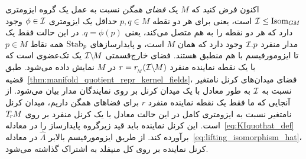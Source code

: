 اکنون فرض کنید که $M$ یک \emph{فضای همگن} نسبت به عمل یک گروه ایزومتری $\mathcal{I} \leq \operatorname{Isom}_{G\mkern-1.4muM}$ است، یعنی برای هر دو نقطه $p,q\in M$ حداقل یک ایزومتری $\phi \in \mathcal{I}$ وجود دارد که هر دو نقطه را به هم متصل می‌کند، یعنی $q = \phi(p)$.
در این حالت فقط یک مدار منفرد $\mathcal{I}.p$ وجود دارد که همان $M$ است، و پایدارسازهای $\operatorname{Stab}_{p}$ همه نقاط $p\in M$ تا ایزومورفیسم با هم منطبق هستند.
فضای خارج‌قسمتی $\mathcal{I}\backslash\mkern-1.5mu M$ یک تک‌عضوی است که با یک نقطه نماینده منفرد $r = \rM(\IM)$ در $M$ نمایش داده می‌شود.
طبق قضیه~\ref{thm:manifold_quotient_repr_kernel_fields}، فضای میدان‌های کرنل نامتغیر نسبت به $\mathcal{I}$ به طور معادل با یک میدان کرنل بر روی نمایندگان مدار بیان می‌شود.
از آنجایی که ما فقط یک نقطه نماینده منفرد $r$ برای فضاهای همگن داریم، میدان کرنل نامتغیر نسبت به ایزومتری کامل در این حالت معادل با یک کرنل منفرد بر روی $\TrM$ است.
این کرنل نماینده باید قید زیرگروه پایدارساز را در معادله~\eqref{eq:KIquothat_def} برآورده کند.
از طریق ایزومورفیسم بالابر $\widehat{\Lambda}$ در معادله~\eqref{eq:lifting_isomorphism_hat}، کرنل نماینده بر روی کل منیفلد به اشتراک گذاشته می‌شود.

